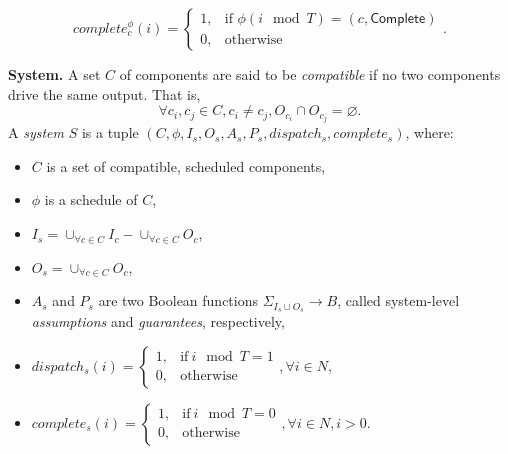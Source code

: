\begin{equation*}
\label{eqn:complete}
    complete_c^\phi(i) =
    \begin{cases}
      1, & \text{if } \phi(i \mod T) = (c, \textsf{Complete}) \\
      0, & \text{otherwise}
    \end{cases}.
\end{equation*}

{\bf System.}
A set $C$ of components are said to be \emph{compatible} if no two components drive the same output. That is,
\begin{equation*}
	\forall c_i,c_j \in C, c_i\neq c_j, O_{c_i} \cap O_{c_j} = \varnothing.
\end{equation*}
A \emph{system} $S$ is a tuple $(C, \phi, I_s, O_s, A_s, P_s, dispatch_s, complete_s)$, where:
\begin{itemize}
	\item $C$ is a set of compatible, scheduled components,
	\item $\phi$ is a schedule of $C$,	
	\item $I_s = \cup_{\forall c \in C}I_c -  \cup_{\forall c \in C}O_c$,
	\item $O_s = \cup_{\forall c \in C}O_c$,
	\item $A_s$ and $P_s$ are two Boolean functions $\Sigma_{I_s \cup O_s} \rightarrow B$, called system-level \emph{assumptions} and \emph{guarantees}, respectively,
	\item $dispatch_s (i) = 
	    	\begin{cases}
      		1, & \text{if}\ i \mod T =1 \\
	     	0, & \text{otherwise}
   	 	\end{cases}, \forall i \in N$,
   	\item $complete_s (i) =
   		\begin{cases}
      		1, & \text{if}\ i \mod T = 0 \\
	     	0, & \text{otherwise}
   	 	\end{cases}, \forall i \in N, i > 0$.
\end{itemize}

